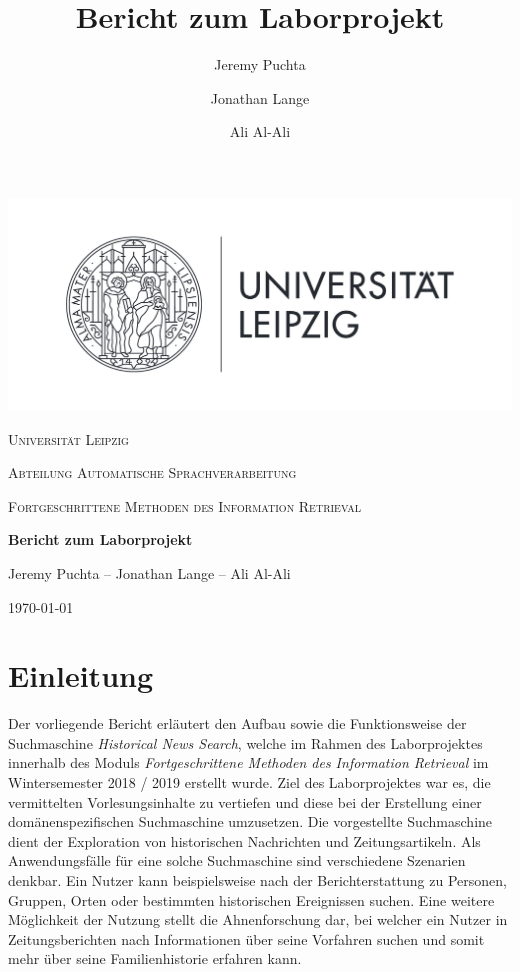 \documentclass[11pt,a4paper, halfparskip]{scrartcl}
\title{Bericht zum Laborprojekt}
\author{Jeremy Puchta \and Jonathan Lange \and Ali Al-Ali}
\begin{document}
\begin{titlepage}
	\centering
	\includegraphics[width=1\textwidth]{Unilogo}\par\vspace{1cm}
	{\scshape\LARGE Universität Leipzig \par}
	\vspace{0.5cm}
	{\scshape\Large Abteilung Automatische Sprachverarbeitung\par}
	\vspace{0.2cm}
	{\scshape\large Fortgeschrittene Methoden des Information Retrieval\par}
	\vspace{1cm}
	{\huge\bfseries Bericht zum Laborprojekt\par}
	\vspace{1cm}
	{\Large Jeremy Puchta -- Jonathan Lange -- Ali Al-Ali \par}

	\vfill
	
	{\large \today\par}
\end{titlepage}

\newpage

\thispagestyle{empty}
\tableofcontents

\newpage
{}
\section{Einleitung}

Der vorliegende Bericht erläutert den Aufbau sowie die Funktionsweise der Suchmaschine \textit{Historical News Search}, welche im Rahmen des Laborprojektes innerhalb des Moduls \textit{Fortgeschrittene Methoden des Information Retrieval} im Wintersemester 2018 / 2019 erstellt wurde. 
Ziel des Laborprojektes war es, die vermittelten Vorlesungsinhalte zu vertiefen und diese bei der Erstellung einer domänenspezifischen Suchmaschine umzusetzen. 
Die vorgestellte Suchmaschine dient der Exploration von historischen Nachrichten und Zeitungsartikeln.
Als Anwendungsfälle für eine solche Suchmaschine sind verschiedene Szenarien denkbar. 
Ein Nutzer kann beispielsweise nach der Berichterstattung zu Personen, Gruppen, Orten oder bestimmten historischen Ereignissen suchen.
Eine weitere Möglichkeit der Nutzung stellt die Ahnenforschung dar, bei welcher ein Nutzer in Zeitungsberichten nach Informationen über seine Vorfahren suchen und somit mehr über seine Familienhistorie erfahren kann.
\end{document}
